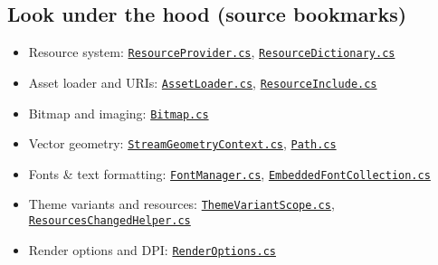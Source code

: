 \subsection{Look under the hood (source
bookmarks)}\label{look-under-the-hood-source-bookmarks-8}

\begin{itemize}
\tightlist
\item
  Resource system:
  \href{https://github.com/AvaloniaUI/Avalonia/blob/master/src/Avalonia.Base/Controls/ResourceProvider.cs}{\passthrough{\lstinline!ResourceProvider.cs!}},
  \href{https://github.com/AvaloniaUI/Avalonia/blob/master/src/Avalonia.Base/Controls/ResourceDictionary.cs}{\passthrough{\lstinline!ResourceDictionary.cs!}}
\item
  Asset loader and URIs:
  \href{https://github.com/AvaloniaUI/Avalonia/blob/master/src/Avalonia.Base/Platform/AssetLoader.cs}{\passthrough{\lstinline!AssetLoader.cs!}},
  \href{https://github.com/AvaloniaUI/Avalonia/blob/master/src/Avalonia.Base/Markup/ResourceInclude.cs}{\passthrough{\lstinline!ResourceInclude.cs!}}
\item
  Bitmap and imaging:
  \href{https://github.com/AvaloniaUI/Avalonia/blob/master/src/Avalonia.Base/Media/Imaging/Bitmap.cs}{\passthrough{\lstinline!Bitmap.cs!}}
\item
  Vector geometry:
  \href{https://github.com/AvaloniaUI/Avalonia/blob/master/src/Avalonia.Base/Media/StreamGeometryContext.cs}{\passthrough{\lstinline!StreamGeometryContext.cs!}},
  \href{https://github.com/AvaloniaUI/Avalonia/blob/master/src/Avalonia.Controls/Shapes/Path.cs}{\passthrough{\lstinline!Path.cs!}}
\item
  Fonts \& text formatting:
  \href{https://github.com/AvaloniaUI/Avalonia/blob/master/src/Avalonia.Base/Media/FontManager.cs}{\passthrough{\lstinline!FontManager.cs!}},
  \href{https://github.com/AvaloniaUI/Avalonia/blob/master/src/Avalonia.Base/Media/Fonts/EmbeddedFontCollection.cs}{\passthrough{\lstinline!EmbeddedFontCollection.cs!}}
\item
  Theme variants and resources:
  \href{https://github.com/AvaloniaUI/Avalonia/blob/master/src/Avalonia.Base/Styling/ThemeVariantScope.cs}{\passthrough{\lstinline!ThemeVariantScope.cs!}},
  \href{https://github.com/AvaloniaUI/Avalonia/blob/master/src/Avalonia.Base/Controls/ResourcesChangedHelper.cs}{\passthrough{\lstinline!ResourcesChangedHelper.cs!}}
\item
  Render options and DPI:
  \href{https://github.com/AvaloniaUI/Avalonia/blob/master/src/Avalonia.Base/Media/RenderOptions.cs}{\passthrough{\lstinline!RenderOptions.cs!}}
\end{itemize}

